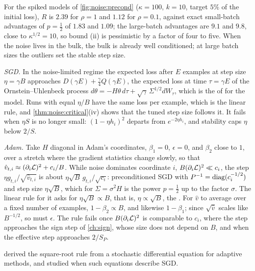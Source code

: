 \begin{refsection}
For the spiked models of \cref{fig:noise:precond} ($\kappa=100$, $k=10$, target $5\%$ of the initial loss), $R$ is $2.39$ for $\rho=1$ and $1.12$ for $\rho=0.1$, against exact small-batch advantages of $p=\frac12$ of $1.83$ and $1.09$; the large-batch advantages are $9.1$ and $9.8$, close to $\kappa^{1/2}=10$, so bound (ii) is pessimistic by a factor of four to five. When the noise lives in the bulk, the bulk is already well conditioned; at large batch sizes the outliers set the stable step size.

\begin{heuristic}
\emph{SGD.} In the noise-limited regime the expected loss after $E$ examples at step size $\eta=\gamma B$ approaches $D(\gamma E)+\frac\gamma4Q(\gamma E)$, the expected loss at time $\tau=\gamma E$ of the Ornstein--Uhlenbeck process $d\theta=-H\theta\,d\tau+\sqrt\gamma\,\Sigma^{1/2}dW_\tau$, which is the  of \textcite{LiTaiE2017} for the model. Runs with equal $\eta/B$ have the same loss per example, which is the linear rule, and \cref{thm:noise:critical}(iv) shows that the tuned step size follows it. It fails when $\eta S$ is no longer small: $(1-\eta h_i)^2$ departs from $e^{-2\eta h_i}$, and stability caps $\eta$ below $2/S$.

\emph{Adam.} Take $H$ diagonal in Adam's coordinates, $\beta_1=0$, $\epsilon=0$, and $\beta_2$ close to $1$, over a stretch where the gradient statistics change slowly, so that $\hat v_{t,i}\approx(\partial_i\mathcal{L})^2+c_i/B$. While noise dominates coordinate $i$, $B(\partial_i\mathcal{L})^2\ll c_i$, the step $\eta g_{t,i}/\sqrt{\hat v_{t,i}}$ is about $\eta\sqrt B\,g_{t,i}/\sqrt{c_i}$: preconditioned SGD with $P^{-1}=\operatorname{diag}(c_i^{-1/2})$ and step size $\eta\sqrt B$, which for $\Sigma=\sigma^2H$ is the power $p=\frac12$ up to the factor $\sigma$. The linear rule for it asks for $\eta\sqrt B\propto B$, that is, $\eta\propto\sqrt B$, the . For $\hat v$ to average over a fixed number of examples, $1-\beta_2\propto B$, and likewise $1-\beta_1$; since $\sqrt{\hat v}$ scales like $B^{-1/2}$, so must $\epsilon$. The rule fails once $B(\partial_i\mathcal{L})^2$ is comparable to $c_i$, where the step approaches the sign step of \cref{ch:sign}, whose size does not depend on $B$, and when the effective step approaches $2/S_P$.
\end{heuristic}

\Textcite{MalladiEtAl2022} derived the square-root rule from a stochastic differential equation for adaptive methods, and \textcite{LiMalladiArora2021} studied when such equations describe SGD.


\end{refsection}
